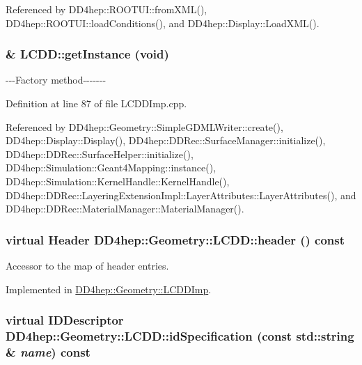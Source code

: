 Referenced by DD4hep::ROOTUI::fromXML(), DD4hep::ROOTUI::loadConditions(), and DD4hep::Display::LoadXML().\hypertarget{class_d_d4hep_1_1_geometry_1_1_l_c_d_d_a4ba28eb0e53e15856d7a773c4ff758b9}{
\subsubsection[{getInstance}]{ \& LCDD::getInstance (void)}}
\label{class_d_d4hep_1_1_geometry_1_1_l_c_d_d_a4ba28eb0e53e15856d7a773c4ff758b9}


-\/-\/-\/Factory method-\/-\/-\/-\/-\/-\/-\/ 

Definition at line 87 of file LCDDImp.cpp.

Referenced by DD4hep::Geometry::SimpleGDMLWriter::create(), DD4hep::Display::Display(), DD4hep::DDRec::SurfaceManager::initialize(), DD4hep::DDRec::SurfaceHelper::initialize(), DD4hep::Simulation::Geant4Mapping::instance(), DD4hep::Simulation::KernelHandle::KernelHandle(), DD4hep::DDRec::LayeringExtensionImpl::LayerAttributes::LayerAttributes(), and DD4hep::DDRec::MaterialManager::MaterialManager().\hypertarget{class_d_d4hep_1_1_geometry_1_1_l_c_d_d_ad09f49fc86a5b286ae55901e2b169d7c}{
\subsubsection[{header}]{\setlength{\rightskip}{0pt plus 5cm}virtual {\bf Header} DD4hep::Geometry::LCDD::header () const}}
\label{class_d_d4hep_1_1_geometry_1_1_l_c_d_d_ad09f49fc86a5b286ae55901e2b169d7c}


Accessor to the map of header entries. 

Implemented in \hyperlink{class_d_d4hep_1_1_geometry_1_1_l_c_d_d_imp_a04116248704015c4691e4918b3ff0c07}{DD4hep::Geometry::LCDDImp}.\hypertarget{class_d_d4hep_1_1_geometry_1_1_l_c_d_d_ac08b5db047061a7b08d8b78bd7cb5e72}{
\subsubsection[{idSpecification}]{\setlength{\rightskip}{0pt plus 5cm}virtual {\bf IDDescriptor} DD4hep::Geometry::LCDD::idSpecification (const std::string \& {\em name}) const}}
\label{class_d_d4hep_1_1_geometry_1_1_l_c_d_d_ac08b5db047061a7b08d8b78bd7cb5e72}


